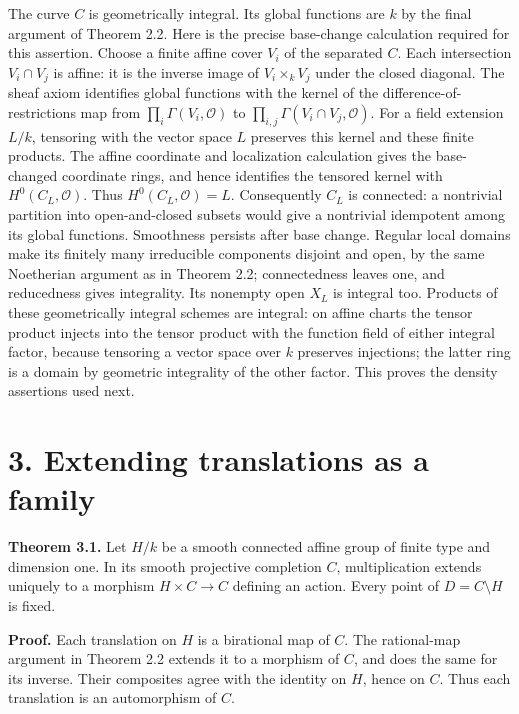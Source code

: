 \documentclass[11pt,a4paper,openany]{report}
\newcounter{none}
\begin{document}
The curve \(C\) is geometrically integral. Its global functions are \(k\) by the final argument of Theorem 2.2. Here is the precise base-change calculation required for this assertion. Choose a finite affine cover \(V_i\) of the separated \(C\). Each intersection \(V_i\cap V_j\) is affine: it is the inverse image of \(V_i\times_k V_j\) under the closed diagonal. The sheaf axiom identifies global functions with the kernel of the difference-of-restrictions map from \(\prod_i\Gamma(V_i,\mathcal O)\) to \(\prod_{i,j}\Gamma(V_i\cap V_j,\mathcal O)\). For a field extension \(L/k\), tensoring with the vector space \(L\) preserves this kernel and these finite products. The affine coordinate and localization calculation gives the base-changed coordinate rings, and hence identifies the tensored kernel with \(H^0(C_L,\mathcal O)\). Thus \(H^0(C_L,\mathcal O)=L\). Consequently \(C_L\) is connected: a nontrivial partition into open-and-closed subsets would give a nontrivial idempotent among its global functions. Smoothness persists after base change. Regular local domains make its finitely many irreducible components disjoint and open, by the same Noetherian argument as in Theorem 2.2; connectedness leaves one, and reducedness gives integrality. Its nonempty open \(X_L\) is integral too. Products of these geometrically integral schemes are integral: on affine charts the tensor product injects into the tensor product with the function field of either integral factor, because tensoring a vector space over \(k\) preserves injections; the latter ring is a domain by geometric integrality of the other factor. This proves the density assertions used next.

\section{3. Extending translations as a family}\label{AG-RG-S03-extending-translations-as-a-family}

\textbf{Theorem 3.1.} Let \(H/k\) be a smooth connected affine group of finite type and dimension one. In its smooth projective completion \(C\), multiplication extends uniquely to a morphism \(H\times C\to C\) defining an action. Every point of \(D=C\setminus H\) is fixed.

\textbf{Proof.} Each translation on \(H\) is a birational map of \(C\). The rational-map argument in Theorem 2.2 extends it to a morphism of \(C\), and does the same for its inverse. Their composites agree with the identity on \(H\), hence on \(C\). Thus each translation is an automorphism of \(C\).
\end{document}
